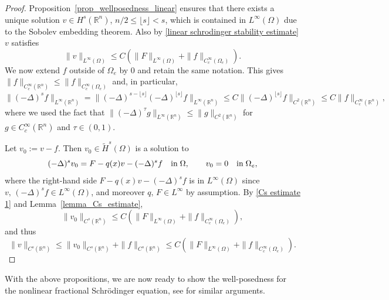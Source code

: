 \documentclass [oneside,11pt] {amsart}
\newcommand{\floor}[1]{\lfloor #1 \rfloor}
\numberwithin{equation}{section}
\newcommand{\R}{\mathbb{R}}
\newcommand{\LC}{\left(}
\newcommand{\RC}{\right)}
\begin{document}
\begin{proof}
Proposition~\ref{prop_wellposedness_linear} ensures that there exists a unique solution $v\in H^s(\R^n)$, $n/2 \leq \floor{s} < s$, which is contained in $L^\infty(\Omega)$ due to the Sobolev embedding theorem. Also by \eqref{linear schrodinger stability estimate} $v$ satisfies 
\begin{equation}\label{Cs estimate 1}
\|v\|_{L^\infty(\Omega)}\le C\left(\|F\|_{L^\infty(\Omega)}+\|f\|_{C^\infty_c (\Omega_e)}\right).
\end{equation}
We now extend $f$ outside of $\Omega_e$ by $0$ and retain the same notation. This gives $\|f\|_{C_c^\infty(\R^n)}\le \|f\|_{C_c^\infty(\Omega_e)}$ and, in particular, 
\[
\|(-\Delta)^sf\|_{L^\infty(\R^n)}
=\| (-\Delta)^{s-\floor{s}}(-\Delta)^{\floor{s}}f\|_{L^\infty(\R^n)}
\le C\|(-\Delta)^{\floor{s}}f\|_{C^2(\R^n)}
\le C\|f\|_{C^\infty_c(\R^n)},
\]
where we used the fact that $\|(-\Delta)^\tau g\|_{L^\infty(\R^n)}\le \|g\|_{C^2(\R^n)}$ for $g\in C_c^\infty(\R^n)$ and $\tau\in (0,1)$.

Let $v_0 := v-f$. Then $v_0\in \widetilde{H}^s(\Omega)$ is a solution to 
\begin{equation}\label{eq_wellpose_pf_v0}
(-\Delta)^s v_0 =F -q(x)v-(-\Delta)^sf \quad \hbox{in} \; \Omega,\qquad v_0=0\quad\hbox{in}\; \Omega_e,
\end{equation}
where the right-hand side $F -q(x)v-(-\Delta)^sf$ is in $L^\infty(\Omega)$ since $v,\, (-\Delta)^s f\in L^\infty(\Omega)$, and moreover $q,\,F\in L^\infty$ by assumption. 
By \eqref{Cs estimate 1} and Lemma~\ref{lemma_Cs_estimate}, 
\[
\|v_0\|_{C^s(\R^n)}\le C (\|F\|_{L^\infty(\Omega)}+\|f\|_{C_c^\infty (\Omega_e)}),
\]
and thus
\[
\|v\|_{C^{s}(\R^n)} 
\le \|v_0\|_{C^{s}(\R^n)}+\|f\|_{C^{s}(\R^n)}
\le C \LC\|F\|_{L^\infty(\Omega)}+\|f\|_{C_c^\infty(\Omega_e)}\RC.
\]
\end{proof}



With the above propositions, we are now ready to show the well-posedness for the nonlinear fractional Schr\"odinger equation, see \cite[Theorem 2.1]{lai_inverse_2022} for similar arguments.
\end{document}
